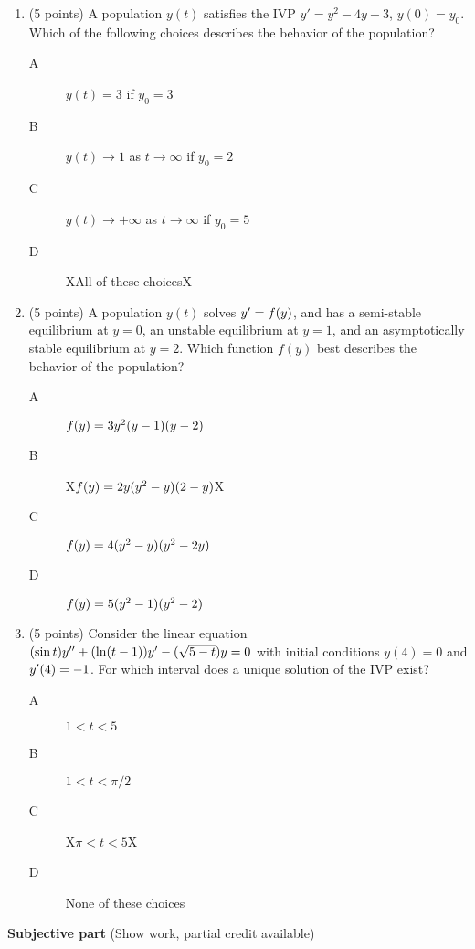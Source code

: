 \documentclass{article}
\begin{document}
\begin{enumerate}

\item (5 points) A population $y(t)$ satisfies the IVP $y'=y^2-4y+3$, $y(0)=y_0$.  Which of the following choices describes the behavior of the population?
\begin{description}
\item[A] $y(t)=3$ if $y_0=3$
\item[B] $y(t)\rightarrow1$ as $t\rightarrow\infty$ if $y_0=2$		
\item[C] $y(t)\rightarrow+\infty$ as $t\rightarrow\infty$ if $y_0=5$
\item[D] XAll of these choicesX
\end{description}

\item (5 points) A population $y(t)$ solves $y\sp\prime=f(y)$, and has a semi-stable equilibrium at $y=0$, an unstable equilibrium at $y=1$, and an asymptotically stable equilibrium at $y=2$.  Which function $f(y)$ best describes the behavior of the population?
\begin{description}
\item[A] $f(y)=3y\sp2(y-1)(y-2)$
\item[B] X$f(y)=2y(y\sp2-y)(2-y)$X
\item[C] $f(y)=4(y\sp2-y)(y\sp2-2y)$
\item[D] $f(y)=5(y\sp2-1)(y\sp2-2)$
\end{description}

\newpage
\item (5 points) Consider the linear equation $(\sin t)y\sp{\prime\prime}+(\ln(t-1))y\sp\prime-(\sqrt{5-t})y=0$ with initial conditions $y(4)=0$ and $y\sp\prime(4)=-1$.  For which interval does a unique solution of the IVP exist?
\begin{description}
\item[A] $1<t<5$
\item[B] $1<t<\pi/2$		
\item[C] X$\pi<t<5$X
\item[D] None of these choices
\end{description}

\end{enumerate}

\bigskip\noindent
{\bf Subjective part} (Show work, partial credit available)
\end{document}
